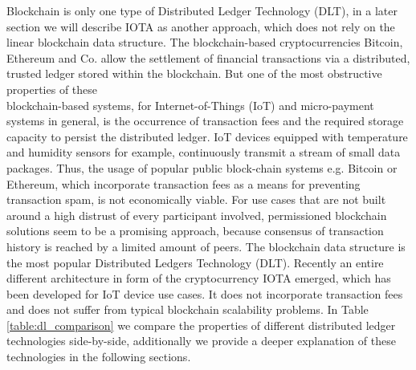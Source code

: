 Blockchain is only one type of Distributed Ledger Technology (DLT), in a later section we will describe IOTA as another approach, which does not rely on the linear blockchain data structure.
The blockchain-based cryptocurrencies Bitcoin, Ethereum and Co. allow the settlement of financial transactions via a distributed, trusted ledger stored within the blockchain. 
But one of the most obstructive properties of these \\ blockchain-based systems, for Internet-of-Things (IoT) and micro-payment systems in general, is the occurrence of transaction fees and the required storage capacity to persist the distributed ledger.
IoT devices equipped with temperature and humidity sensors for example, continuously transmit a stream of small data packages. Thus, the usage of popular public block-chain systems e.g. Bitcoin or Ethereum, which incorporate transaction fees as a means for preventing transaction spam, is not economically viable. For use cases that are not built around a high distrust of every participant involved, permissioned blockchain solutions seem to be a promising approach, because consensus of transaction history is reached by a limited amount of peers. The blockchain data structure is the most popular Distributed Ledgers Technology (DLT). Recently an entire different architecture in form of the cryptocurrency IOTA emerged, which has been developed for IoT device use cases. It does not incorporate transaction fees and does not suffer from typical blockchain scalability problems. In Table \ref{table:dl_comparison} we compare the properties of different distributed ledger technologies side-by-side, additionally we provide a deeper explanation of these technologies in the following sections. 

